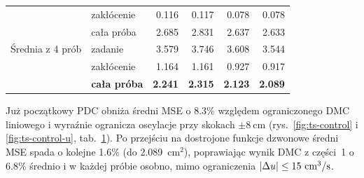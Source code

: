 \begin{table}[H]
\begin{tabular}{llrrrr}
                                  & zakłócenie & \num{0.116} & \num{0.117} & \num{0.078} & \num{0.078}\\
                                  & cała próba & \num{2.685} & \num{2.831} & \num{2.637} & \num{2.633}\\\midrule
Średnia z 4 prób                  & zadanie    & \num{3.579} & \num{3.746} & \num{3.608} & \num{3.544}\\
                                  & zakłócenie & \num{1.164} & \num{1.161} & \num{0.927} & \num{0.917}\\
                                  & \textbf{cała próba} & \textbf{\num{2.241}} & \textbf{\num{2.315}} & \textbf{\num{2.123}} & \textbf{\num{2.089}}\\\bottomrule
\end{tabular}
\label{tab:ts-control}
\end{table}

Już początkowy PDC obniża średni MSE o \num{8.3}\% względem ograniczonego DMC liniowego i wyraźnie ogranicza oscylacje przy skokach $\pm8\ \mathrm{cm}$ (rys.~\ref{fig:ts-control} i \ref{fig:ts-control-u}, tab.~\ref{tab:ts-control}). Po przejściu na dostrojone funkcje dzwonowe średni MSE spada o kolejne \num{1.6}\% (do \num{2.089}~$\mathrm{cm^2}$), poprawiając wynik DMC z części~1 o \num{6.8}\% średnio i w każdej próbie osobno, mimo ograniczenia $|\Delta u|\leq15\ \jednprzep$.
